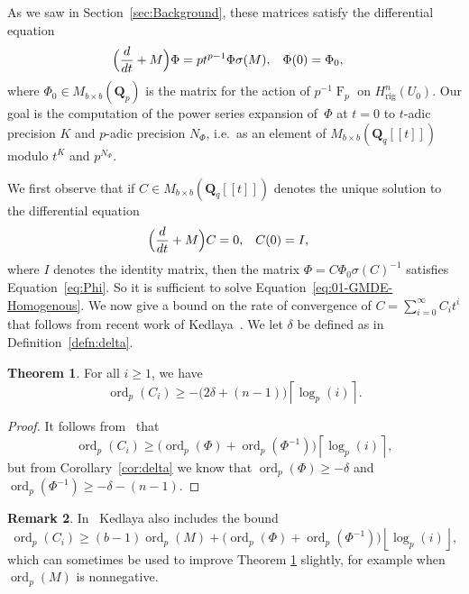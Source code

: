 \documentclass[a4paper,11pt]{article}
\numberwithin{equation}{section}
\providecommand{\floor}[1]{\left\lfloor#1\right\rfloor}   %
\providecommand{\ceil}[1]{\left\lceil#1\right\rceil}   %
\newcommand{\QQ}{\mathbf{Q}} %
\DeclareMathOperator{\ord}{ord}          %
\DeclareMathOperator{\Frob}{F}           %
\providecommand{\Hrig}{H_{\text{rig}}}  %
\theoremstyle{definition}
\newtheorem{thm}{Theorem}[section]
\newtheorem{rem}[thm]{Remark}
\begin{document}
As we saw in Section~\ref{sec:Background}, these matrices satisfy 
the differential equation
\begin{align} \label{eq:Phi}
\Bigl(\frac{d}{dt} + M\Bigr) \Phi &= p t^{p-1} \Phi \sigma(M), &\Phi(0)& = \Phi_0, 
\end{align}
where $\Phi_0 \in M_{b \times b}(\QQ_p)$ is the matrix for the action 
of $p^{-1} \Frob_p$ on $\Hrig^n(U_0)$. Our goal is the computation of 
the power series expansion of~$\Phi$ at $t=0$ to $t$-adic precision $K$ 
and $p$-adic precision $N_{\Phi}$, i.e.\ as an element of 
$M_{b \times b}(\QQ_q[[t]])$ modulo $t^K$ and $p^{N_{\Phi}}$.

We first observe that if 
$C \in M_{b \times b}(\QQ_q[[t]])$ denotes 
the unique solution to the differential equation
\begin{align} \label{eq:01-GMDE-Homogenous}
\Bigl(\frac{d}{dt} + M\Bigr) C &= 0, &C(0)&=I, 
\end{align}
where $I$ denotes the identity matrix, 
then the matrix $\Phi = C \Phi_0 \sigma(C)^{-1}$ satisfies 
Equation~\eqref{eq:Phi}. So it is sufficient to solve 
Equation~\eqref{eq:01-GMDE-Homogenous}. 
We now give a bound on the rate of 
convergence of $C=\sum_{i=0}^{\infty} C_i t^i$ that
follows from recent work of 
Kedlaya~\citep{Kedlaya2010}. 
We let $\delta$ be defined as in Definition~\ref{defn:delta}. 

\begin{thm} \label{thm:valC}
For all $i \geq 1$, we have
\begin{equation*}
\ord_p(C_i) \geq - \bigl(2 \delta + (n - 1)\bigr) \ceil{\log_p(i)}.
\end{equation*}
\end{thm}

\begin{proof}
It follows from~\citep[Theorem~{18.3.3}]{Kedlaya2010} that
\begin{equation*}
\ord_p(C_i) \geq \bigl( \ord_p(\Phi) + \ord_p(\Phi^{-1}) \bigr) \ceil{\log_p(i)},
\end{equation*}
but from Corollary~\ref{cor:delta} we know that $\ord_p(\Phi) \geq -\delta$ and 
$\ord_p(\Phi^{-1}) \geq -\delta-(n-1)$.
\end{proof}

\begin{rem}
In~\citep[Remark~18.3.4]{Kedlaya2010} Kedlaya also includes the bound
\begin{equation*}
\ord_p(C_i) \geq (b - 1) \ord_p(M) 
            + \bigl( \ord_p(\Phi) + \ord_p(\Phi^{-1}) \bigr) \floor{\log_p(i)},
\end{equation*}
which can sometimes be used to improve Theorem \ref{thm:valC} 
slightly, for example when $\ord_p(M)$ is nonnegative.
\end{rem}
\end{document}

